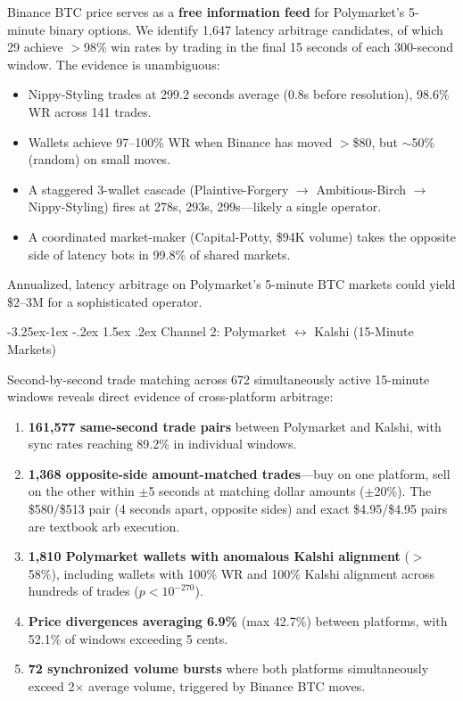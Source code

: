 \documentclass[11pt,a4paper]{article}
\makeatletter
\renewcommand\subsection{\@startsection{subsection}{2}{\z@}%
  {-3.25ex\@plus -1ex \@minus -.2ex}%
  {1.5ex \@plus .2ex}%
  {\normalfont\large\bfseries}}
\makeatother
\begin{document}
Binance BTC price serves as a \textbf{free information feed} for Polymarket's 5-minute binary options. We identify 1,647 latency arbitrage candidates, of which 29 achieve $>$98\% win rates by trading in the final 15 seconds of each 300-second window. The evidence is unambiguous:

\begin{itemize}[nosep]
    \item Nippy-Styling trades at 299.2 seconds average (0.8s before resolution), 98.6\% WR across 141 trades.
    \item Wallets achieve 97--100\% WR when Binance has moved $>$\$80, but $\sim$50\% (random) on small moves.
    \item A staggered 3-wallet cascade (Plaintive-Forgery $\to$ Ambitious-Birch $\to$ Nippy-Styling) fires at 278s, 293s, 299s---likely a single operator.
    \item A coordinated market-maker (Capital-Potty, \$94K volume) takes the opposite side of latency bots in 99.8\% of shared markets.
\end{itemize}

Annualized, latency arbitrage on Polymarket's 5-minute BTC markets could yield \$2--3M for a sophisticated operator.

\subsection{Channel 2: Polymarket $\leftrightarrow$ Kalshi (15-Minute Markets)}

Second-by-second trade matching across 672 simultaneously active 15-minute windows reveals direct evidence of cross-platform arbitrage:

\begin{enumerate}[nosep]
    \item \textbf{161,577 same-second trade pairs} between Polymarket and Kalshi, with sync rates reaching 89.2\% in individual windows.
    \item \textbf{1,368 opposite-side amount-matched trades}---buy on one platform, sell on the other within $\pm$5 seconds at matching dollar amounts ($\pm$20\%). The \$580/\$513 pair (4 seconds apart, opposite sides) and exact \$4.95/\$4.95 pairs are textbook arb execution.
    \item \textbf{1,810 Polymarket wallets with anomalous Kalshi alignment} ($>$58\%), including wallets with 100\% WR and 100\% Kalshi alignment across hundreds of trades ($p < 10^{-270}$).
    \item \textbf{Price divergences averaging 6.9\%} (max 42.7\%) between platforms, with 52.1\% of windows exceeding 5 cents.
    \item \textbf{72 synchronized volume bursts} where both platforms simultaneously exceed 2$\times$ average volume, triggered by Binance BTC moves.
\end{enumerate}
\end{document}
